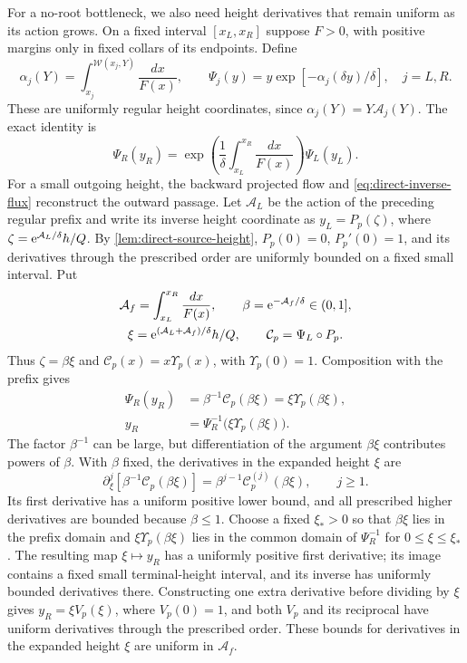 For a no-root bottleneck, we also need height derivatives that remain
uniform as its action grows. On a fixed interval
\([x_L,x_R]\) suppose
\(F>0\), with positive margins only in fixed collars of its
endpoints. Define
\[
 \alpha_j(Y)=\int_{x_j}^{\mathcal W(x_j,Y)}\frac{dx}{F(x)},\qquad
 \Psi_j(y)=y\exp[-\alpha_j(\delta y)/\delta],\quad j=L,R.
\]
These are uniformly regular height coordinates, since
\(\alpha_j(Y)=Y\mathcal A_j(Y)\). The exact identity is
\begin{equation}
\label{eq:direct-bottleneck-action}
 \Psi_R(y_R)=
 \exp\left(\frac1\delta\int_{x_L}^{x_R}\frac{dx}{F(x)}\right)
 \Psi_L(y_L).
\end{equation}
For a small outgoing height, the backward projected flow and
\eqref{eq:direct-inverse-flux} reconstruct the outward passage.
Let \(\mathcal A_L\) be the action of the preceding
regular prefix and write its inverse height coordinate as
\(y_L=P_p(\zeta)\), where
\(\zeta=\mathrm e^{\mathcal A_L/\delta}h/Q\). By
\cref{lem:direct-source-height}, \(P_p(0)=0\), \(P_p'(0)=1\),
and its derivatives through the prescribed order are uniformly
bounded on a fixed small interval. Put
\[
 \begin{gathered}
 \mathcal A_f=\int_{x_L}^{x_R}\frac{dx}{F(x)},\qquad
 \beta=\mathrm e^{-\mathcal A_f/\delta}\in(0,1],\\
 \xi=\mathrm e^{(\mathcal A_L+\mathcal A_f)/\delta}h/Q,
 \qquad \mathcal C_p=\Psi_L\circ P_p.
 \end{gathered}
\]
Thus \(\zeta=\beta\xi\) and
\(\mathcal C_p(x)=x\Upsilon_p(x)\), with \(\Upsilon_p(0)=1\).
Composition with the prefix gives
\begin{equation}
\label{eq:direct-bottleneck-inverse-composition}
 \begin{aligned}
 \Psi_R(y_R)&=\beta^{-1}\mathcal C_p(\beta\xi)
             =\xi \Upsilon_p(\beta\xi),\\
 y_R&=\Psi_R^{-1}\bigl(\xi \Upsilon_p(\beta\xi)\bigr).
 \end{aligned}
\end{equation}
The factor \(\beta^{-1}\) can be large, but differentiation of the
argument \(\beta\xi\) contributes powers of \(\beta\). With \(\beta\)
fixed, the derivatives in the expanded height \(\xi\) are
\[
 \partial_\xi^j[\beta^{-1}\mathcal C_p(\beta\xi)]
       =\beta^{j-1}\mathcal C_p^{(j)}(\beta\xi),\qquad j\ge1.
\]
Its first derivative has a uniform positive lower bound, and
all prescribed higher derivatives are bounded because \(\beta\le1\).
Choose a fixed \(\xi_* >0\) so that \(\beta\xi\) lies in the
prefix domain and \(\xi \Upsilon_p(\beta\xi)\) lies in the common
domain of \(\Psi_R^{-1}\) for \(0\le\xi\le\xi_*\).
The resulting map \(\xi\mapsto y_R\) has a uniformly positive
first derivative; its image contains a fixed small terminal-height interval,
and its inverse has uniformly bounded derivatives there.
Constructing one extra derivative before dividing by \(\xi\) gives
\(y_R=\xi V_p(\xi)\), where \(V_p(0)=1\), and both \(V_p\)
and its reciprocal have uniform derivatives through the prescribed
order. These bounds for derivatives in the expanded height \(\xi\)
are uniform in \(\mathcal A_f\).


